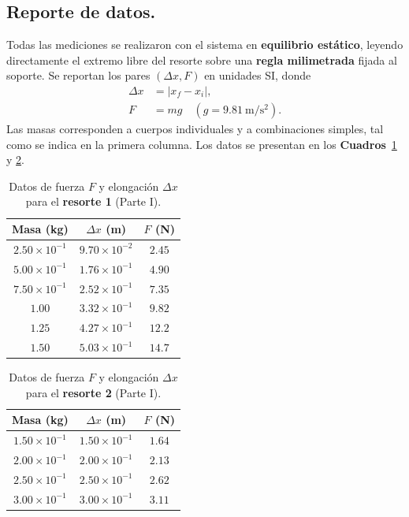 \documentclass[11pt,twocolumn]{article}
\begin{document}
\subsection{Reporte de datos.}

Todas las mediciones se realizaron con el sistema en \textbf{equilibrio estático}, leyendo directamente el extremo libre del resorte sobre una \textbf{regla milimetrada} fijada al soporte. Se reportan los pares \((\Delta x, F)\) en unidades SI, donde
\begin{align*}
    \Delta x &= |x_f - x_i|, \\[4pt]
    F &= m g \quad (g = 9.81~\mathrm{m/s^2}).
\end{align*}
Las masas corresponden a cuerpos individuales y a combinaciones simples, tal como se indica en la primera columna. 
Los datos se presentan en los \textbf{Cuadros}~\ref{tab:resorte1_parte1} y \ref{tab:resorte2_parte1}.

\begin{table}
\centering
\caption{Datos de fuerza $F$ y elongación $\Delta x$ para el \textbf{resorte 1} (Parte I).}
\label{tab:resorte1_parte1}
\begin{tabular}{|c|c|c|}
\hline
\textbf{Masa} (kg) & $\Delta x$ (m) & $F$ (N) \\ \hline
$2.50\times10^{-1}$ & $9.70\times10^{-2}$ & $2.45$ \\ \hline
$5.00\times10^{-1}$ & $1.76\times10^{-1}$ & $4.90$ \\ \hline
$7.50\times10^{-1}$ & $2.52\times10^{-1}$ & $7.35$ \\ \hline
$1.00$              & $3.32\times10^{-1}$ & $9.82$ \\ \hline
$1.25$              & $4.27\times10^{-1}$ & $12.2$ \\ \hline
$1.50$              & $5.03\times10^{-1}$ & $14.7$ \\ \hline
\end{tabular}
\end{table}

\begin{table}
\centering
\caption{Datos de fuerza $F$ y elongación $\Delta x$ para el \textbf{resorte 2} (Parte I).}
\label{tab:resorte2_parte1}
\begin{tabular}{|c|c|c|}
\hline
\textbf{Masa} (kg) & $\Delta x$ (m) & $F$ (N) \\ \hline
$1.50\times10^{-1}$ & $1.50\times10^{-1}$ & $1.64$ \\ \hline
$2.00\times10^{-1}$ & $2.00\times10^{-1}$ & $2.13$ \\ \hline
$2.50\times10^{-1}$ & $2.50\times10^{-1}$ & $2.62$ \\ \hline
$3.00\times10^{-1}$ & $3.00\times10^{-1}$ & $3.11$ \\ \hline
\end{tabular}
\end{table}
\end{document}
